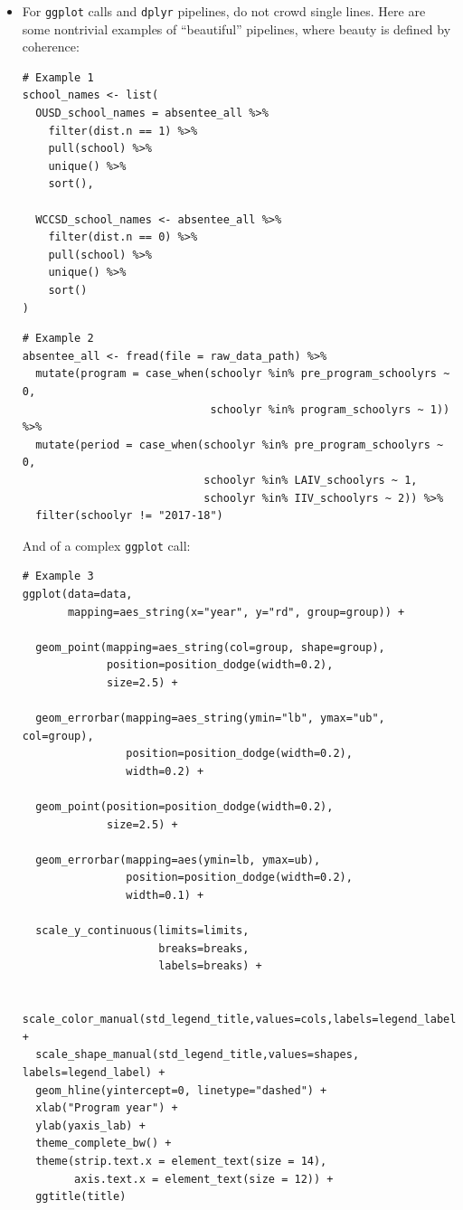 \documentclass[]{book}
\begin{document}
\begin{itemize}
\item
  For \texttt{ggplot} calls and \texttt{dplyr} pipelines, do not crowd single lines. Here are some nontrivial examples of ``beautiful'' pipelines, where beauty is defined by coherence:

\begin{verbatim}
# Example 1
school_names <- list(
  OUSD_school_names = absentee_all %>%
    filter(dist.n == 1) %>%
    pull(school) %>%
    unique() %>%
    sort(),

  WCCSD_school_names <- absentee_all %>%
    filter(dist.n == 0) %>%
    pull(school) %>%
    unique() %>%
    sort()
)
\end{verbatim}

\begin{verbatim}
# Example 2
absentee_all <- fread(file = raw_data_path) %>%
  mutate(program = case_when(schoolyr %in% pre_program_schoolyrs ~ 0,
                             schoolyr %in% program_schoolyrs ~ 1)) %>%
  mutate(period = case_when(schoolyr %in% pre_program_schoolyrs ~ 0,
                            schoolyr %in% LAIV_schoolyrs ~ 1,
                            schoolyr %in% IIV_schoolyrs ~ 2)) %>%
  filter(schoolyr != "2017-18")
\end{verbatim}

  And of a complex \texttt{ggplot} call:

\begin{verbatim}
# Example 3
ggplot(data=data,
       mapping=aes_string(x="year", y="rd", group=group)) +

  geom_point(mapping=aes_string(col=group, shape=group),
             position=position_dodge(width=0.2),
             size=2.5) +

  geom_errorbar(mapping=aes_string(ymin="lb", ymax="ub", col=group),
                position=position_dodge(width=0.2),
                width=0.2) +

  geom_point(position=position_dodge(width=0.2),
             size=2.5) +

  geom_errorbar(mapping=aes(ymin=lb, ymax=ub),
                position=position_dodge(width=0.2),
                width=0.1) +

  scale_y_continuous(limits=limits,
                     breaks=breaks,
                     labels=breaks) +

  scale_color_manual(std_legend_title,values=cols,labels=legend_label) +
  scale_shape_manual(std_legend_title,values=shapes, labels=legend_label) +
  geom_hline(yintercept=0, linetype="dashed") +
  xlab("Program year") +
  ylab(yaxis_lab) +
  theme_complete_bw() +
  theme(strip.text.x = element_text(size = 14),
        axis.text.x = element_text(size = 12)) +
  ggtitle(title)
\end{verbatim}
\end{itemize}
\end{document}
